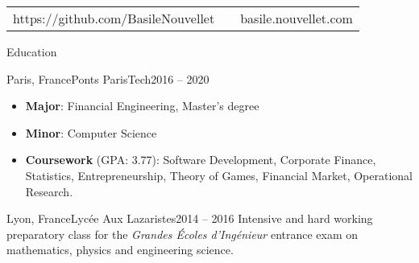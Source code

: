 \documentclass[]{mcdowellcv}
\begin{document}
    \makeheader

    \begin{tabu}
        to 1\textwidth { X[l,p] X[c,p] X[r,p] }
        https://github.com/BasileNouvellet & \textbf{} & basile.nouvellet.com \\
    \end{tabu}

    \begin{cvsection}{Education}

        \begin{cvsubsection}{Paris, France}{Ponts ParisTech}{2016 -- 2020}
            \begin{itemize}
                \item \textbf{Major}: Financial Engineering, Master's degree
                \item \textbf{Minor}: Computer Science
                \item \textbf{Coursework} (GPA: 3.77): Software Development, Corporate Finance, Statistics, Entrepreneurship, Theory of Games, Financial Market, Operational Research.
            \end{itemize}
        \end{cvsubsection}

        \begin{cvsubsection}{Lyon, France}{Lyc\'ee Aux Lazaristes}{2014 -- 2016}
            Intensive and hard working preparatory class for the \textit{Grandes \'Ecoles d'Ing\'enieur} entrance exam on mathematics, physics and engineering science.
        \end{cvsubsection}

    \end{cvsection}
\end{document}
